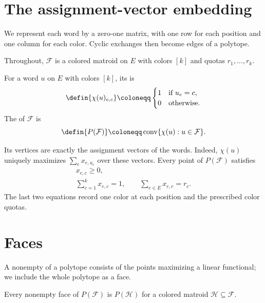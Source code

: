 
\section[polytope]{The assignment-vector embedding}

We represent each word by a zero-one matrix, with one row for each position
and one column for each color. Cyclic exchanges then become edges of a
polytope.

Throughout, $\mathcal F$ is a colored matroid on $E$ with colors $[k]$ and
quotas $r_1,\dotsc,r_k$.

\begin{definition}
For a word $u$ on $E$ with colors $[k]$, its  is
\[
 \defin{\chi(u)_{e,c}}\coloneqq
 \begin{cases}
  1&\text{if }u_e=c,\\
  0&\text{otherwise}.
 \end{cases}
\]
The  of $\mathcal F$ is
\[
 \defin{P(\mathcal F)}\coloneqq
 \operatorname{conv}\{\chi(u):u\in\mathcal F\}.
\]
\end{definition}

Its vertices are exactly the assignment vectors of the words. Indeed,
$\chi(u)$ uniquely maximizes $\sum_e x_{e,u_e}$ over these vectors. Every
point of $P(\mathcal F)$ satisfies
\[
 \begin{gathered}
 x_{e,c}\geq0,\\
 \sum_{c=1}^k x_{e,c}=1,\qquad
 \sum_{e\in E}x_{e,c}=r_c.
 \end{gathered}
\]
The last two equations record one color at each position and the prescribed
color quotas.

\section[polytopeFaces]{Faces}

A nonempty  of a polytope consists of the points maximizing a
linear functional; we include the whole polytope as a face.

\begin{proposition}
Every nonempty face of $P(\mathcal F)$ is $P(\mathcal H)$ for a colored
matroid $\mathcal H\subseteq\mathcal F$.
\end{proposition}

